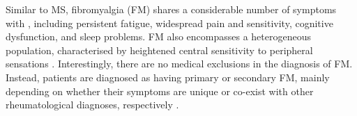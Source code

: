 
Similar to MS, fibromyalgia (FM) shares a considerable number of symptoms with \cfs, including persistent fatigue, widespread pain and sensitivity, cognitive dysfunction, and sleep problems.
FM also encompasses a heterogeneous population, characterised by heightened central sensitivity to peripheral sensations
\citep{kodner2015CommonQuestions}.
Interestingly, there are no medical exclusions in the diagnosis of FM.
Instead, patients are diagnosed as having primary or secondary FM, mainly depending on whether their symptoms are unique or co-exist with other rheumatological diagnoses, respectively \citep{natelsonMyalgicEncephalomyelitisChronic2019}.

